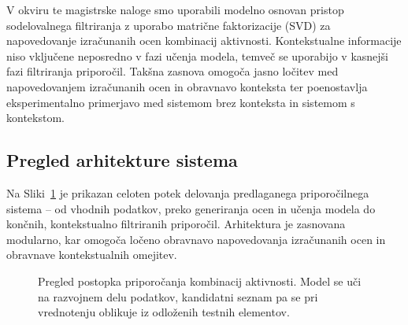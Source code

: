 \documentclass[a4paper,twoside,openright,12pt,slovene]{book}
\begin{document}
V okviru te magistrske naloge smo uporabili modelno osnovan pristop sodelovalnega filtriranja z uporabo matrične faktorizacije (SVD) za napovedovanje izračunanih ocen kombinacij aktivnosti. Kontekstualne informacije niso vključene neposredno v fazi učenja modela, temveč se uporabijo v kasnejši fazi filtriranja priporočil. Takšna zasnova omogoča jasno ločitev med napovedovanjem izračunanih ocen in obravnavo konteksta ter poenostavlja eksperimentalno primerjavo med sistemom brez konteksta in sistemom s kontekstom.


\subsection{Pregled arhitekture sistema}
\label{sec:sys_architecture}

Na Sliki~\ref{fig:system_overview} je prikazan celoten potek delovanja
predlaganega priporočilnega sistema – od vhodnih podatkov, preko
generiranja ocen in učenja modela do končnih, kontekstualno filtriranih
priporočil. Arhitektura je zasnovana modularno, kar omogoča ločeno obravnavo
napovedovanja izračunanih ocen in obravnave kontekstualnih omejitev.

\begin{figure}[H]
\centering
{}
\caption{Pregled postopka priporočanja kombinacij aktivnosti.
Model se uči na razvojnem delu podatkov, kandidatni seznam
pa se pri vrednotenju oblikuje iz odloženih testnih elementov.}
\label{fig:system_overview}
\end{figure}
\end{document}
